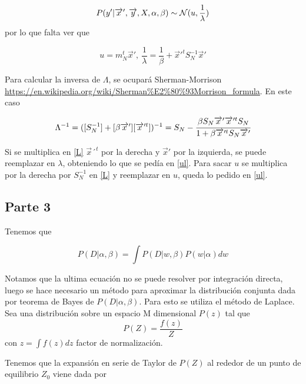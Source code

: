 \begin{equation}
    P(y'|\overrightarrow{x}',\overrightarrow{y},X,\alpha,\beta) \sim \mathcal{N} (u,\frac{1}{\lambda})
\end{equation}
por lo que falta ver que 

\begin{equation}
\label{ul}
    u = m_{N}^{t}\overrightarrow{x}',\ \frac{1}{\lambda} = \frac{1}{\beta} + \overrightarrow{x}'^t S_{N}^{-1}\overrightarrow{x}'
\end{equation}


Para calcular la inversa de $\Lambda$, se ocupará Sherman-Morrison \url{https://en.wikipedia.org/wiki/Sherman\%E2\%80\%93Morrison\_formula}. En este caso

\begin{equation}
\label{L}
    \Lambda^{-1} = ([S_{N}^{-1}] + [\beta\overrightarrow{x}'][\overrightarrow{x}'^t])^{-1} = S_N - \cfrac{\beta S_N \overrightarrow{x}'\overrightarrow{x}'^t S_N}{1 + \beta \overrightarrow{x}'^t S_N \overrightarrow{x}'}
\end{equation}

Si se multiplica en \eqref{L} $\overrightarrow{x}´^t$ por la derecha y $\overrightarrow{x}'$ por la izquierda, se puede reemplazar en $\lambda$, obteniendo lo que se pedía en \eqref{ul}. Para sacar $u$ se multiplica por la derecha por $S_{N}^{-1}$ en \eqref{L} y reemplazar en $u$, queda lo pedido en \eqref{ul}.


\subsection{Parte 3}
Tenemos que

\begin{equation}
    P(D|\alpha,\beta)=\int  P(D|w,\beta)P(w|\alpha)dw
\end{equation}

Notamos que la ultima ecuación no se puede resolver por integración  directa, luego se hace necesario un método para aproximar la distribución conjunta dada por teorema de Bayes de $ P(D|\alpha,\beta)$. Para esto se utiliza el método de Laplace. Sea una distribución sobre un espacio M dimensional $P(z)$ tal que
\begin{equation}
    P(Z)=\frac{f(z)}{Z}
\end{equation}
con $z=\int f(z) dz$ factor de normalización. 

Tenemos que la expansión en serie de Taylor de $P(Z)$ al rededor de un punto de equilibrio $Z_{0}$ viene dada por


